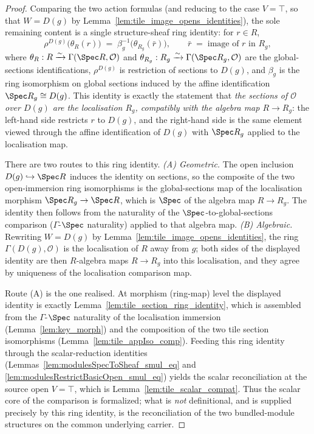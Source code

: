 \begin{proof}
  Comparing the two action formulas (and reducing to the case \(V = \top\), so that \(W = D(g)\) by
  Lemma~\ref{lem:tile_image_opens_identities}), the sole remaining content is a single structure-sheaf ring
  identity: for \(r \in R\),
  \[
    \rho^{D(g)}\bigl(\theta_R(r)\bigr)
      \;=\;
    \beta_g^{-1}\bigl(\theta_{R_g}(\bar r)\bigr),
    \qquad \bar r \;=\; \text{image of } r \text{ in } R_g,
  \]
  where \(\theta_R : R \xrightarrow{\sim} \Gamma(\Spec R,\mathcal{O})\) and \(\theta_{R_g} : R_g
  \xrightarrow{\sim} \Gamma(\Spec R_g,\mathcal{O})\) are the global-sections identifications,
  \(\rho^{D(g)}\) is restriction of sections to \(D(g)\), and \(\beta_g\) is the ring isomorphism on global
  sections induced by the affine identification \(\Spec R_g \cong D(g)\). This identity is exactly the
  statement that \emph{the sections of \(\mathcal{O}\) over \(D(g)\) are the localisation \(R_g\),
  compatibly with the algebra map \(R \to R_g\)}: the left-hand side restricts \(r\) to \(D(g)\), and the
  right-hand side is the same element viewed through the affine identification of \(D(g)\) with
  \(\Spec R_g\) applied to the localisation map.

  There are two routes to this ring identity.
  \emph{(A) Geometric.} The open inclusion \(D(g) \hookrightarrow \Spec R\) induces the identity on
  sections, so the composite of the two open-immersion ring isomorphisms is the global-sections map of the
  localisation morphism \(\Spec R_g \to \Spec R\), which is \(\Spec\) of the algebra map \(R \to R_g\).
  The identity then follows from the naturality of the \(\Spec\)-to-global-sections comparison
  (\(\Gamma\)-\(\Spec\) naturality) applied to that algebra map.
  \emph{(B) Algebraic.} Rewriting \(W = D(g)\) by Lemma~\ref{lem:tile_image_opens_identities}, the ring
  \(\Gamma(D(g),\mathcal{O})\) is the localisation of \(R\) away from \(g\); both sides of the displayed
  identity are then \(R\)-algebra maps \(R \to R_g\) into this localisation, and they agree by uniqueness
  of the localisation comparison map.

  Route (A) is the one realised. At morphism (ring-map) level the displayed identity is exactly
  Lemma~\ref{lem:tile_section_ring_identity}, which is assembled from the \(\Gamma\)-\(\Spec\) naturality
  of the localisation immersion (Lemma~\ref{lem:key_morph}) and the composition of the two tile section
  isomorphisms (Lemma~\ref{lem:tile_appIso_comp}). Feeding this ring identity through the
  scalar-reduction identities (Lemmas~\ref{lem:modulesSpecToSheaf_smul_eq} and
  \ref{lem:modulesRestrictBasicOpen_smul_eq}) yields the scalar reconciliation at the source open
  \(V = \top\), which is Lemma~\ref{lem:tile_scalar_compat}. Thus the scalar core of the comparison is
  formalized; what is \emph{not} definitional, and is supplied precisely by this ring identity, is the
  reconciliation of the two bundled-module structures on the common underlying carrier.
\end{proof}

